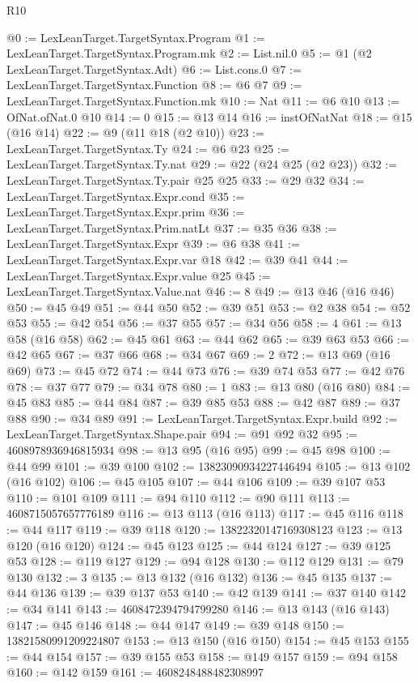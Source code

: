 \begin{lexlean}{R10}
\begin{coremodule}
@0 := LexLeanTarget.TargetSyntax.Program
@1 := LexLeanTarget.TargetSyntax.Program.mk
@2 := List.nil.{0}
@5 := @1 (@2 LexLeanTarget.TargetSyntax.Adt)
@6 := List.cons.{0}
@7 := LexLeanTarget.TargetSyntax.Function
@8 := @6 @7
@9 := LexLeanTarget.TargetSyntax.Function.mk
@10 := Nat
@11 := @6 @10
@13 := OfNat.ofNat.{0} @10
@14 := 0
@15 := @13 @14
@16 := instOfNatNat
@18 := @15 (@16 @14)
@22 := @9 (@11 @18 (@2 @10))
@23 := LexLeanTarget.TargetSyntax.Ty
@24 := @6 @23
@25 := LexLeanTarget.TargetSyntax.Ty.nat
@29 := @22 (@24 @25 (@2 @23))
@32 := LexLeanTarget.TargetSyntax.Ty.pair @25 @25
@33 := @29 @32
@34 := LexLeanTarget.TargetSyntax.Expr.cond
@35 := LexLeanTarget.TargetSyntax.Expr.prim
@36 := LexLeanTarget.TargetSyntax.Prim.natLt
@37 := @35 @36
@38 := LexLeanTarget.TargetSyntax.Expr
@39 := @6 @38
@41 := LexLeanTarget.TargetSyntax.Expr.var @18
@42 := @39 @41
@44 := LexLeanTarget.TargetSyntax.Expr.value @25
@45 := LexLeanTarget.TargetSyntax.Value.nat
@46 := 8
@49 := @13 @46 (@16 @46)
@50 := @45 @49
@51 := @44 @50
@52 := @39 @51
@53 := @2 @38
@54 := @52 @53
@55 := @42 @54
@56 := @37 @55
@57 := @34 @56
@58 := 4
@61 := @13 @58 (@16 @58)
@62 := @45 @61
@63 := @44 @62
@65 := @39 @63 @53
@66 := @42 @65
@67 := @37 @66
@68 := @34 @67
@69 := 2
@72 := @13 @69 (@16 @69)
@73 := @45 @72
@74 := @44 @73
@76 := @39 @74 @53
@77 := @42 @76
@78 := @37 @77
@79 := @34 @78
@80 := 1
@83 := @13 @80 (@16 @80)
@84 := @45 @83
@85 := @44 @84
@87 := @39 @85 @53
@88 := @42 @87
@89 := @37 @88
@90 := @34 @89
@91 := LexLeanTarget.TargetSyntax.Expr.build
@92 := LexLeanTarget.TargetSyntax.Shape.pair
@94 := @91 @92 @32
@95 := 4608978936946815934
@98 := @13 @95 (@16 @95)
@99 := @45 @98
@100 := @44 @99
@101 := @39 @100
@102 := 13823090934227446494
@105 := @13 @102 (@16 @102)
@106 := @45 @105
@107 := @44 @106
@109 := @39 @107 @53
@110 := @101 @109
@111 := @94 @110
@112 := @90 @111
@113 := 4608715057657776189
@116 := @13 @113 (@16 @113)
@117 := @45 @116
@118 := @44 @117
@119 := @39 @118
@120 := 13822320147169308123
@123 := @13 @120 (@16 @120)
@124 := @45 @123
@125 := @44 @124
@127 := @39 @125 @53
@128 := @119 @127
@129 := @94 @128
@130 := @112 @129
@131 := @79 @130
@132 := 3
@135 := @13 @132 (@16 @132)
@136 := @45 @135
@137 := @44 @136
@139 := @39 @137 @53
@140 := @42 @139
@141 := @37 @140
@142 := @34 @141
@143 := 4608472394794799280
@146 := @13 @143 (@16 @143)
@147 := @45 @146
@148 := @44 @147
@149 := @39 @148
@150 := 13821580991209224807
@153 := @13 @150 (@16 @150)
@154 := @45 @153
@155 := @44 @154
@157 := @39 @155 @53
@158 := @149 @157
@159 := @94 @158
@160 := @142 @159
@161 := 4608248488482308997

\end{coremodule}
\end{lexlean}

